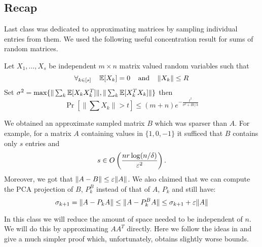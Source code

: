 \documentclass{article}
\begin{document}


\subsection*{Recap} Last class was dedicated to approximating matrices by sampling individual entries from them.
We used the following useful concentration result for sums of random matrices.

\begin{lemma}
Let $X_1,\ldots, X_s$ be independent $m \times n$ matrix valued random variables such that 
\[
\forall _{k \in [s]} \mbox{\;\;\;\;} {\mathbb E}[X_k] = 0 \mbox{\;\;\;\;and\;\;\;\;} \|X_k\| \le R
\]
Set $\sigma^2 = \max\{\|\sum_k {\mathbb E}[X_k X_k^T]\|, \|\sum_k {\mathbb E}[X_k^T X_k]\|\}$ then
\[
\Pr[\|\sum X_{k}\| > t] \le (m+n)e^{-\frac{t^2}{\sigma^2 + Rt/3}}
\]
\end{lemma}
%
\noindent We obtained an approximate sampled matrix $B$ which was sparser than $A$.
For example, for a matrix $A$ containing values in $\{1,0,-1\}$ it sufficed that $B$ contains only $s$ entries and 
\[
s \in O\left(\frac{nr \log(n/\delta)}{\varepsilon^2}\right).
\]
Moreover, we got that $\|A - B\| \le \varepsilon \|A\|$. 
We also claimed that we can compute the PCA projection of $B$, $P_k^B$ instead of that of $A$, $P_k$ and still have:
 \[
 \sigma_{k+1} =  \|A - P_k A\|  \le \|A - P_k^B A\| \le \sigma_{k+1} + \varepsilon\|A\|
 \]

\noindent In this class we will reduce the amount of space needed to be independent of $n$. We will do this by approximating $AA^T$ directly.
Here we follow the ideas in \cite{rvSamplingFromLargeMatrices2007} and give a much simpler proof which, unfortunately, obtains slightly worse bounds.
\end{document}
